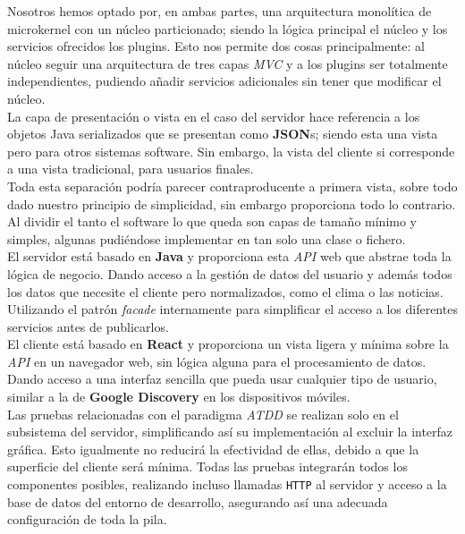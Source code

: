 \documentclass[../ei103948-project-documentation.tex]{subfiles}
\begin{document}
    Nosotros hemos optado por, en ambas partes, una arquitectura monolítica de microkernel con un núcleo particionado; siendo la lógica principal el núcleo y los servicios ofrecidos los plugins. Esto nos permite dos cosas principalmente: al núcleo seguir una arquitectura de tres capas \textit{MVC} y a los plugins ser totalmente independientes, pudiendo añadir servicios adicionales sin tener que modificar el núcleo.\\

    La capa de presentación o vista en el caso del servidor hace referencia a los objetos Java serializados que se presentan como \textbf{JSON}s; siendo esta una vista pero para otros sistemas software. Sin embargo, la vista del cliente si corresponde a una vista tradicional, para usuarios finales.\\

    Toda esta separación podría parecer contraproducente a primera vista, sobre todo dado nuestro principio de simplicidad, sin embargo proporciona todo lo contrario. Al dividir el tanto el software lo que queda son capas de tamaño mínimo y simples, algunas pudiéndose implementar en tan solo una clase o fichero.\\

    El servidor está basado en \textbf{Java} y proporciona esta \textit{API} web que abstrae toda la lógica de negocio. Dando acceso a la gestión de datos del usuario y además todos los datos que necesite el cliente pero normalizados, como el clima o las noticias. Utilizando el patrón \textit{facade} internamente para simplificar el acceso a los diferentes servicios antes de publicarlos.\\

    El cliente está basado en \textbf{React} y proporciona un vista ligera y mínima sobre la \textit{API} en un navegador web, sin lógica alguna para el procesamiento de datos. Dando acceso a una interfaz sencilla que pueda usar cualquier tipo de usuario, similar a la de \textbf{Google Discovery} en los dispositivos móviles.\\

    Las pruebas relacionadas con el paradigma \textit{ATDD} se realizan solo en el subsistema del servidor, simplificando así su implementación al excluir la interfaz gráfica. Esto igualmente no reducirá la efectividad de ellas, debido a que la superficie del cliente será mínima. Todas las pruebas integrarán todos los componentes posibles, realizando incluso llamadas \texttt{HTTP} al servidor y acceso a la base de datos del entorno de desarrollo, asegurando así una adecuada configuración de toda la pila.
\end{document}
